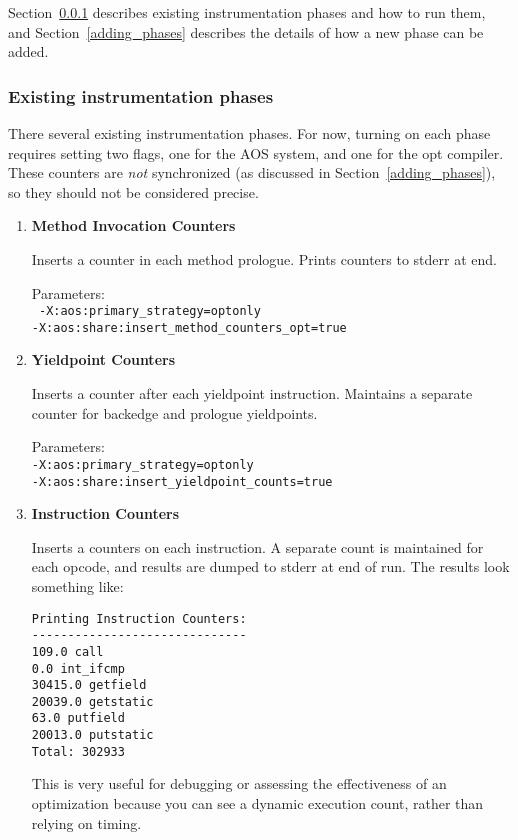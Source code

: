 Section~\ref{existing_phases} describes existing instrumentation
phases and how to run them, and Section~\ref{adding_phases}
describes the details of how a new phase can be added.
\subsubsection{Existing instrumentation phases}
\label{existing_phases}
There several existing instrumentation phases.  For now,
turning on each phase requires setting two flags, one for the AOS
system, and one for the opt compiler.  These counters are {\em not}
synchronized (as discussed in Section~\ref{adding_phases}), so they
should not be considered precise.
\begin{enumerate}
\item {\bf Method Invocation Counters} 

Inserts a counter in each method prologue.  Prints counters to stderr
at end.

Parameters: \\
{\tt
-X:aos:primary\_strategy=optonly \\
-X:aos:share:insert\_method\_counters\_opt=true}

\item {\bf Yieldpoint Counters}  

Inserts a counter after each yieldpoint instruction.  Maintains a
separate counter for backedge and prologue yieldpoints.

Parameters:\\
{\tt -X:aos:primary\_strategy=optonly \\
-X:aos:share:insert\_yieldpoint\_counts=true}




\item {\bf Instruction Counters}  

Inserts a counters on each instruction.  A separate count is
maintained for each opcode, and results are dumped to stderr at end of
run. The results look something like:

\begin{verbatim}
Printing Instruction Counters:
------------------------------
109.0 call
0.0 int_ifcmp
30415.0 getfield
20039.0 getstatic
63.0 putfield
20013.0 putstatic
Total: 302933
\end{verbatim}

This is very useful for debugging or assessing the effectiveness
of an optimization because you can see a dynamic execution count, rather
than relying on timing.  


\end{enumerate}
